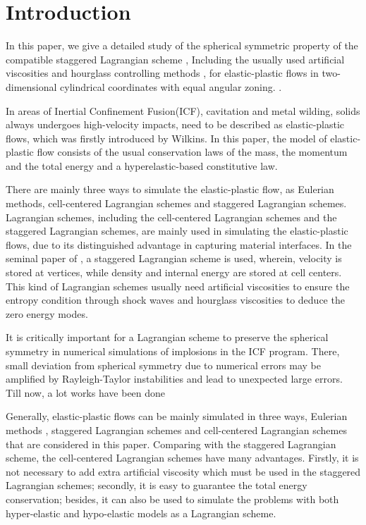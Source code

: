 \documentclass[review]{elsarticle}
\begin{document}
\section{Introduction}

In this paper, we give a detailed study of the spherical symmetric property of the compatible staggered Lagrangian scheme \cite{}, Including the usually used artificial  viscosities \cite{} and hourglass controlling methods \cite{}, for elastic-plastic flows in two-dimensional cylindrical coordinates with equal angular zoning. .   

In areas of Inertial Confinement Fusion(ICF), cavitation and metal wilding, solids always undergoes high-velocity impacts, need to be described as elastic-plastic flows, which was firstly introduced by Wilkins\cite{}. In this paper, the model of elastic-plastic flow consists of the usual conservation laws of the mass,  the momentum and the total energy and a hyperelastic-based constitutive law.  

There are mainly three ways to simulate the elastic-plastic flow, as Eulerian methods, cell-centered Lagrangian schemes and staggered Lagrangian schemes.  Lagrangian schemes, including the cell-centered  Lagrangian schemes and the staggered Lagrangian schemes, are mainly used in simulating the elastic-plastic flows, due to its distinguished advantage in capturing material interfaces. In the seminal paper of \cite{}, a staggered Lagrangian scheme is used, wherein, velocity is stored at vertices, while density and internal energy are stored at cell centers. This kind of Lagrangian schemes usually  need artificial viscosities to ensure the entropy condition  through shock waves and hourglass viscosities to deduce the zero energy modes. 

It is critically important for a Lagrangian scheme to  preserve the spherical symmetry in numerical simulations of implosions in the ICF program. There, small deviation from spherical symmetry due to numerical errors may be amplified by Rayleigh-Taylor instabilities and lead to unexpected large errors. Till now, a lot works have been done   

Generally, elastic-plastic flows can be mainly simulated in three ways, Eulerian methods \cite{trangenstein1991higher,miller2001high,barton2009exact,liu2008modified}, staggered Lagrangian schemes \cite{wilkins1963calculation} and cell-centered Lagrangian schemes \cite{burton2013cell,kluth2010discretization,maire2013nominally,cheng2017third} that  are  considered in this paper. Comparing with the staggered Lagrangian scheme, the cell-centered Lagrangian  schemes  have many advantages. Firstly, it is  not necessary to add  extra artificial viscosity  which  must be used in the staggered Lagrangian schemes; secondly, it is easy to guarantee the total energy conservation; besides, it can also be used to simulate the problems with both  hyper-elastic and hypo-elastic models  \cite{burton2013cell,kluth2010discretization,maire2013nominally,cheng2017third}  as a Lagrangian scheme.
\end{document}
